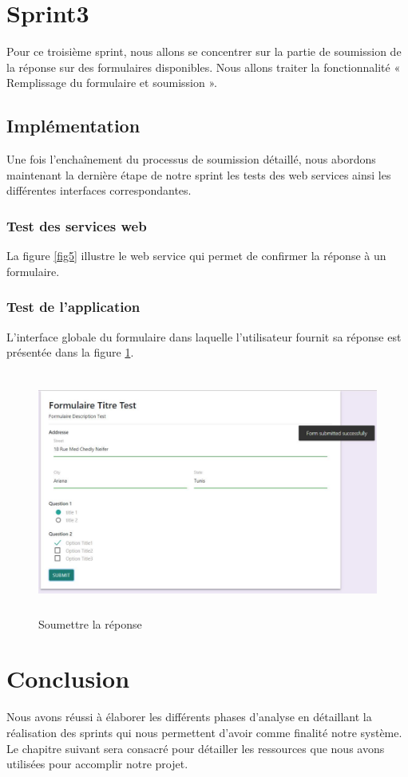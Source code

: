 \section{Sprint3}
Pour ce troisième sprint, nous allons se concentrer sur la partie de soumission de la réponse sur des formulaires disponibles. Nous allons traiter la fonctionnalité « Remplissage du formulaire et soumission ».

\subsection{Implémentation}
Une fois l’enchaînement du processus de soumission détaillé, nous abordons maintenant la dernière étape de notre sprint les tests des web services ainsi les différentes interfaces correspondantes.
\subsubsection{Test des services web}
La figure \ref{fig5} illustre le web service qui permet de confirmer la réponse à un formulaire.
\subsubsection{Test de l'application }  
L'interface globale du formulaire dans laquelle l'utilisateur fournit sa réponse est présentée dans la figure  \ref{fig6}.
\begin{figure} [H]
    \centering
         \begin{center}
             \includegraphics [width=16cm,height=8cm] {SprintImage/interfaceForm.JPG}
            \caption{Soumettre la réponse }
            \label{fig6}
        \end{center}
    \end{figure}

\section{Conclusion}
Nous avons réussi à élaborer les différents phases d’analyse en détaillant la réalisation des sprints qui nous permettent d'avoir comme finalité notre système. \\
Le chapitre suivant sera consacré pour détailler les ressources
que nous avons utilisées pour accomplir notre projet.